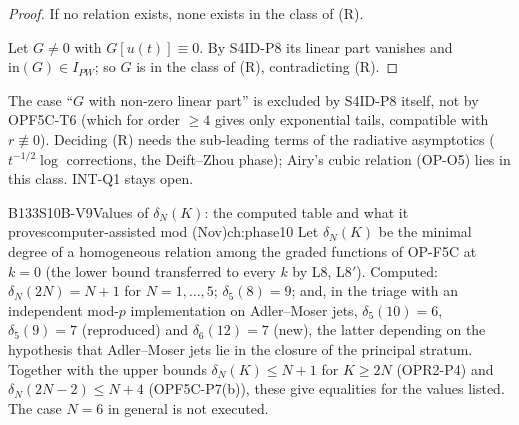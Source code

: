 \begin{proof}
If no relation exists, none exists in the class of (R).

Let $G\ne0$ with $G[u(t)]\equiv0$. By S4ID-P8 its linear part vanishes and $\mathrm{in}(G)\in I_{PW}$; so $G$ is in the class of (R), contradicting (R).

\end{proof}

\begin{caution}[title={It is an equivalence, not a reduction}]
The case ``$G$ with non-zero linear part'' is excluded by S4ID-P8 itself, not by OPF5C-T6 (which for order $\ge4$ gives only exponential tails, compatible with $r\not\equiv0$). Deciding (R) needs the sub-leading terms of the radiative asymptotics ($t^{-1/2}\log$ corrections, the Deift--Zhou phase); Airy's cubic relation (OP-O5) lies in this class. INT-Q1 stays open.
\end{caution}

\begin{dimcard}{B133}{S10B-V9}{Values of $\delta_N(K)$: the computed table and what it proves}{computer-assisted \pw{} mod (Nov)}{ch:phase10}
Let $\delta_N(K)$ be the minimal degree of a homogeneous relation among the graded functions of OP-F5C at $k=0$ (the lower bound transferred to every $k$ by L8, L8$'$). Computed: $\delta_N(2N)=N+1$ for $N=1,\dots,5$; $\delta_5(8)=9$; and, in the triage with an independent mod-$p$ implementation on Adler--Moser jets, $\delta_5(10)=6$, $\delta_5(9)=7$ (reproduced) and $\delta_6(12)=7$ (new), the latter depending on the hypothesis that Adler--Moser jets lie in the closure of the principal stratum. Together with the upper bounds $\delta_N(K)\le N+1$ for $K\ge2N$ (OPR2-P4) and $\delta_N(2N-2)\le N+4$ (OPF5C-P7(b)), these give equalities for the values listed. The case $N=6$ in general is not executed.
\end{dimcard}

